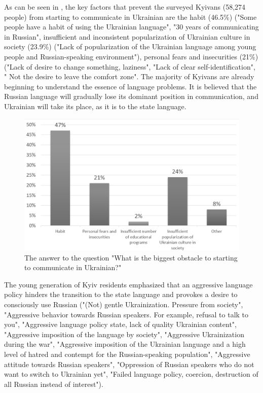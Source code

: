 \documentclass[english]{textolivre}
\begin{document}
As can be seen in , the key factors that prevent the surveyed Kyivans (58,274 people) from starting to communicate in Ukrainian are the habit (46.5\%) ("Some people have a habit of using the Ukrainian language", "30 years of communicating in Russian", insufficient and inconsistent popularization of Ukrainian culture in society (23.9\%) ("Lack of popularization of the Ukrainian language among young people and Russian-speaking environment"), personal fears and insecurities (21\%) ("Lack of desire to change something, laziness", "Lack of clear self-identification", " Not the desire to leave the comfort zone". The majority of Kyivans are already beginning to understand the essence of language problems. It is believed that the Russian language will gradually lose its dominant position in communication, and Ukrainian will take its place, as it is to the state language.

\begin{figure}[h!]
\centering
\begin{minipage}{.7\textwidth}
 \includegraphics[width=\textwidth]{Fig7.png}
 \caption{The answer to the question "What is the biggest obstacle to starting to communicate in Ukrainian?"}
 \label{fig7}
\end{minipage}
\end{figure}

The young generation of Kyiv residents emphasized that an aggressive language policy hinders the transition to the state language and provokes a desire to consciously use Russian ("(Not) gentle Ukrainization. Pressure from society", "Aggressive behavior towards Russian speakers. For example, refusal to talk to you", "Aggressive language policy state, lack of quality Ukrainian content", "Aggressive imposition of the language by society", "Aggressive Ukrainization during the war", "Aggressive imposition of the Ukrainian language and a high level of hatred and contempt for the Russian-speaking population", "Aggressive attitude towards Russian speakers", "Oppression of Russian speakers who do not want to switch to Ukrainian yet", "Failed language policy, coercion, destruction of all Russian instead of interest").
\end{document}
